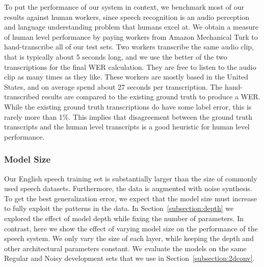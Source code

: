 \documentclass{article}
\begin{document}
To put the performance of our system in context, we benchmark most of our results against human workers, since speech recognition is an audio perception and language understanding problem that humans excel at. We obtain a measure of human level performance by paying workers from Amazon Mechanical Turk to hand-transcribe all of our test sets. Two workers transcribe the same audio clip, that is typically about 5 seconds long, and we use the better of the two transcriptions for the final WER calculation. They are free to listen to the audio clip as many times as they like. These workers are mostly based in the United States, and on average spend about 27 seconds per transcription. The hand-transcribed results are compared to the existing ground truth to produce a WER. While the existing ground truth transcriptions do have some label error, this is rarely more than 1\%. This implies that disagreement between the ground truth transcripts and the human level transcripts is a good heuristic for human level performance.

\subsubsection{Model Size}

Our English speech training set is substantially larger than the size of commonly used speech datasets. Furthermore, the data is augmented with noise synthesis. To get the best generalization error, we expect that the model size must increase to fully exploit the patterns in the data. In Section~\ref{subsection:depth} we explored the effect of model depth while fixing the number of parameters. In contrast, here we show the effect of varying model size on the performance of the speech system. We only vary the size of each layer, while keeping the depth and other architectural parameters constant. We evaluate the models on the same Regular and Noisy development sets that we use in Section~\ref{subsection:2dconv}.
\end{document}
